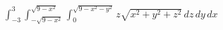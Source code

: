 \item $\int_{-3}^3 \int_{-\sqrt{9-x^2}}^{\sqrt{9-x^2}} \int_0^{\sqrt{9-x^2-y^2}} z\sqrt{x^2 + y^2 + z^2} \, dz \, dy \, dx$
